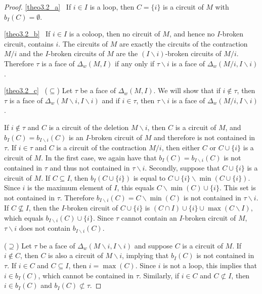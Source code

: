 \documentclass[10pt]{amsart}
\theoremstyle{definition}
\begin{document}
\begin{proof}%

\ref{theo3.2_a}~%
If $i\in I$ is a loop, then $C = \{i\}$ is a circuit of $M$ with $b_I(C) = \emptyset$. 

\ref{theo3.2_b}~%
If $i\in I$ is a coloop, then no circuit of $M$, and hence no $I$-broken circuit, contains $i$. 
The circuits of $M$ are exactly the circuits of the contraction $M/i$ and the $I$-broken circuits of $M$ 
are the $(I\backslash i)$-broken circuits of $M/i$. 
Therefore $\tau$ is a face of $\Delta_w(M,I)$ if any only if $\tau\backslash i$ is a face of $\Delta_w(M/i,I\backslash i)$.

\ref{theo3.2_c}~%
($\subseteq$) Let $\tau$ be a face of $\Delta_w(M,I)$. We will show that if $i\not\in \tau$, then $\tau$ is a 
face of $\Delta_w(M\backslash i ,I\backslash i)$ and if $i \in \tau$, then $\tau\backslash i$ is a face of $\Delta_w(M/i ,I\backslash i)$.

If $i\not\in \tau$ and $C$ is a circuit of the deletion $M\backslash i$, then $C$
is a circuit of $M$, and $b_I(C)=b_{I\backslash i}(C)$ is an $I$-broken circuit of $M$ and therefore is not contained in $\tau$. 
If $i \in \tau$ and $C$ is a circuit of the contraction $M/i$, then either $C$ or $C\cup \{i\}$ is a circuit of $M$. 
In the first case, we again have that $b_I(C)=b_{I\backslash i}(C)$ is not contained in $\tau$ and thus not contained in $\tau\backslash i$. 
Secondly, suppose that $C\cup\{i\}$ is a circuit of $M$. 
If $C\subseteq I$, then $b_I(C\cup\{i\})$ is equal to $C\cup\{i\}\backslash \min(C\cup\{i\})$. Since $i$ is the maximum element of $I$, 
this equals $C\backslash \min(C) \cup\{i\}$. This set is not contained in $\tau$. Therefore $b_{I\backslash i}(C) = C\backslash \min(C)$ 
is not contained in $\tau \backslash i$. 
If $C\not\subseteq I$, then the $I$-broken circuit of $C\cup \{i\}$ is $(C\cap I) \cup \{ i\} \cup \max(C\backslash I)$, 
which equals $b_{I\backslash i}(C) \cup \{i\}$. Since $\tau$ cannot contain an $I$-broken circuit of $M$, $\tau\backslash i$ does not contain $b_{I\backslash i}(C)$. 

($\supseteq$) Let $\tau$ be a face of $\Delta_w(M\backslash i ,I\backslash i)$ and suppose $C$ is a circuit of $M$. 
If $i\not\in C$, then $C$ is also a circuit of $M\backslash i $, implying that $b_I(C)$ is not contained in $\tau$. 
If $i\in C$ and $C\subseteq I$, then $i = \max(C)$. Since $i$ is not a loop, this implies that $i\in b_I(C)$, which 
 cannot be contained in $\tau$. Similarly, if $i\in C$ and $C\not\subset I$, then $i\in b_I(C)$ and $b_I(C)\not\subset \tau$. 


\end{proof}
\end{document}
